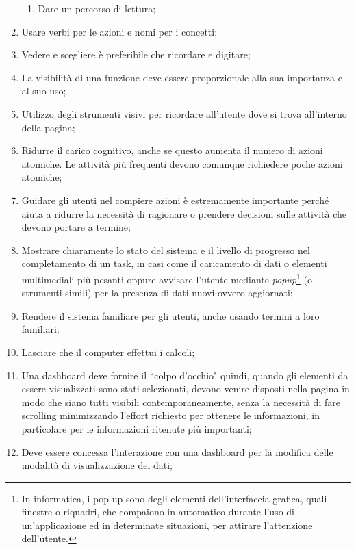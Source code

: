 \begin{enumerate}
\begin{enumerate}[label=\alph*.]
        \item Dare un percorso di lettura; \label{lg:5.b}
    \end{enumerate}
    \item Usare verbi per le azioni e nomi per i concetti; \label{lg:6}
    \item Vedere e scegliere è preferibile che ricordare e digitare;\label{lg:7}
    \item La visibilità di una funzione deve essere proporzionale alla sua importanza e al suo uso;\label{lg:8}
    \item Utilizzo degli strumenti visivi per ricordare all'utente dove si trova all'interno della pagina;\label{lg:9}
    \item Ridurre il carico cognitivo, anche se questo aumenta il numero di azioni atomiche. Le attività più frequenti devono comunque richiedere poche azioni atomiche;\label{lg:10}
    \item Guidare gli utenti nel compiere azioni è estremamente importante perché aiuta a ridurre la necessità di ragionare o prendere decisioni sulle attività che devono portare a termine;\label{lg:11}
    \item Mostrare chiaramente lo stato del sistema e il livello di progresso nel completamento di un task, in casi come il caricamento di dati o elementi multimediali più pesanti oppure avvisare l'utente mediante \textit{popup}\footnote{In informatica, i pop-up sono degli elementi dell'interfaccia grafica, quali finestre o riquadri, che compaiono in automatico durante l'uso di un'applicazione ed in determinate situazioni, per attirare l'attenzione dell'utente.} (o strumenti simili) per la presenza di dati nuovi ovvero aggiornati;\label{lg:12}
    \item Rendere il sistema familiare per gli utenti, anche usando termini a loro familiari;\label{lg:13}
    \item Lasciare che il computer effettui i calcoli;\label{lg:14}
    \item Una dashboard deve fornire il ``colpo d'occhio" quindi, quando gli elementi da essere visualizzati sono stati selezionati, devono venire disposti nella pagina in modo che siano tutti visibili contemporaneamente, senza la necessità di fare scrolling minimizzando l'effort richiesto per ottenere le informazioni, in particolare per le informazioni ritenute più importanti;\label{lg:15}
    \item Deve essere concessa l'interazione con una dashboard per la modifica delle modalità di visualizzazione dei dati;\label{lg:16}

\end{enumerate}
